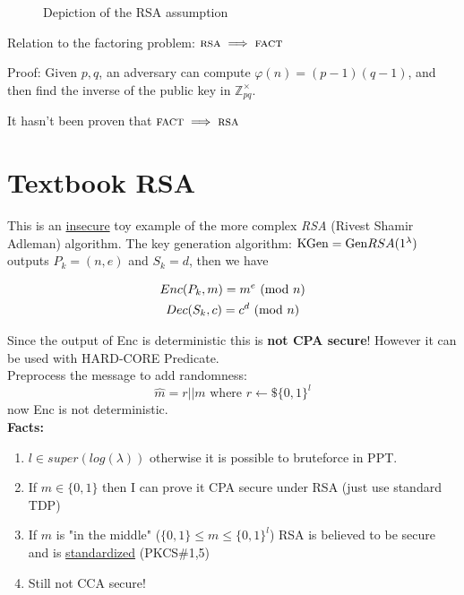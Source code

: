 \begin{figure}[h!]
   \centering
   \sdinit{}
   \caption{Depiction of the RSA assumption}
   \label{fig:game_pke-rsa}
\end{figure}

Relation to the factoring problem: $\textsc{rsa} \implies \textsc{fact}$

Proof: Given $p, q$, an adversary can compute $\varphi(n) = (p-1)(q-1)$, and then find the inverse of the public key in $\mathbb{Z}_{pq}^\times$.

It hasn't been proven that $\textsc{fact} \implies \textsc{rsa}$

\section{Textbook RSA}
This is an \underline{insecure} toy example of the more complex \textit{RSA} (Rivest Shamir Adleman) algorithm.
The key generation algorithm: $\mathrm{KGen}=\mathrm{Gen} RSA(1^{\lambda})$ outputs $P_k=(n,e)$ and $S_k=d$, then we have

\begin{gather*}
    Enc(P_k,m)=m^e\ (\mathrm{mod}\ n)\\
    Dec(S_k,c)=c^d\ (\mathrm{mod}\ n)
\end{gather*}

Since the output of Enc is deterministic this is \textbf{not CPA secure}! However it can be used with HARD-CORE Predicate.\\
Preprocess the message to add randomness:
$$\hat{m}=r||m \text{ where }r\leftarrow\mathdollar\{0,1\}^l$$
now Enc is not deterministic.\\
\textbf{Facts:}
\begin{enumerate}
    \item $l \in super(log(\lambda))$ otherwise it is possible to bruteforce in PPT.
    \item If $m\in\{0,1\}$ then I can prove it CPA secure under RSA (just use standard TDP)
    \item If $m$ is "in the middle" ($\{0,1\} \leq m \leq \{0,1\}^l$) RSA is believed to be secure and is \underline{standardized} (PKCS\#1,5)
    \item Still not CCA secure!
\end{enumerate}

